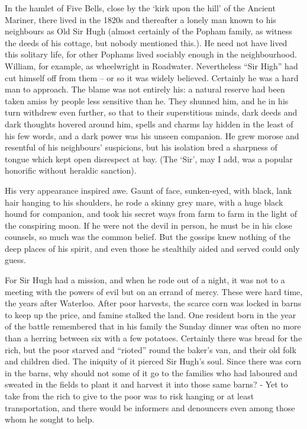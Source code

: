 
In the hamlet of Five Bells, close by the ‘kirk upon the hill’ of the Ancient Mariner, there lived in the 1820s and thereafter a lonely man known to his neighbours as Old Sir Hugh (almost certainly of the Popham family, as witness the deeds of his cottage, but nobody mentioned this.). He need not have lived this solitary life, for other Pophams lived sociably enough in the neighbourhood. William, for example, as wheelwright in Roadwater. Nevertheless “Sir High”  had cut himself off from them – or so it was widely believed. Certainly he was a hard man to approach. The blame was not entirely his: a natural reserve had been taken amiss by people less sensitive than he. They shunned him, and he in his turn withdrew even further, so that to their superstitious minds, dark deeds and dark thoughts hovered around him, spells and charms lay hidden in the least of his few words, and a dark power was his unseen companion. He grew morose and resentful of his neighbours’ suspicions, but his isolation bred a sharpness of tongue which kept open disrespect at bay. (The ‘Sir’, may I add, was a popular honorific without heraldic sanction). 
 
His very appearance inspired awe. Gaunt of face, sunken-eyed, with black, lank hair hanging to his shoulders, he rode a skinny grey mare, with a huge black hound for companion, and took his secret ways from farm to farm in the light of the conspiring moon. If he were not the devil in person, he must be in his close counsels, so much was the common belief. But the gossips knew nothing of the deep places of his spirit, and even those he stealthily aided and served could only guess.

For Sir Hugh had a mission, and when he rode out of a night, it was not to a meeting with the powers of evil but on an errand of mercy. These were hard time, the years after Waterloo. After poor harvests, the scarce corn was locked in barns to keep up the price, and famine stalked the land. One resident born in the year of the battle remembered that in his family the Sunday dinner was often no more than a herring between six with a few potatoes. Certainly there was bread for the rich, but the poor starved and “rioted” round the baker’s van, and their old folk and children died. The iniquity of it pierced Sir Hugh’s soul. Since there was corn in the barns, why should not some of it go to the families who had laboured and sweated in the fields to plant it and harvest it into those same barns? - Yet to take from the rich to give to the poor was to risk hanging or at least transportation, and there would be informers and denouncers even among those whom he sought to help. 


